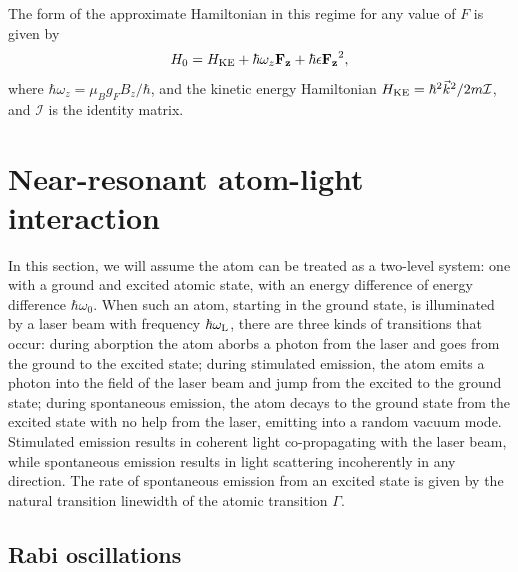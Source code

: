 The form of the approximate Hamiltonian in this regime for any value of $F$ is given by
\begin{equation}
H_0 = H_{\rm KE} + \hbar \omega_z \mathbf{F_z} + \hbar\epsilon \mathbf{F_z}^2,
\end{equation}
where $\hbar \omega_z = \mu_B g_F B_z/\hbar$, and the kinetic energy Hamiltonian $H_{\rm KE} = \hbar^2 \vec{k}^2/2m \mathcal{I}$, and $\mathcal{I}$ is the identity matrix.

\section{Near-resonant atom-light interaction}\label{chap:2sec:atomLight}

In this section, we will assume the atom can be treated as a two-level system: one with a ground and excited atomic state, with an energy difference of energy difference $\hbar\omega_0$. When such an atom, starting in the ground state, is illuminated by a laser beam with frequency $\hbar\omega_{\rm{L}}$, there are three kinds of transitions that occur: during aborption the atom aborbs a photon from the laser and goes from the ground to the excited state; during stimulated emission, the atom emits a photon into the field of the laser beam and jump from the excited to the ground state; during spontaneous emission, the atom decays to the ground state from the excited state with no help from the laser, emitting into a random vacuum mode. Stimulated emission results in coherent light co-propagating with the laser beam, while spontaneous emission results in light scattering incoherently in any direction. The rate of spontaneous emission from an excited state is given by the natural transition linewidth of the atomic transition $\Gamma$. 

\subsection{Rabi oscillations}

